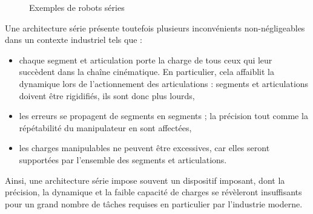 \begin{figure}[!ht]
  \centering
       \hfill
    \caption{\footnotesize{Exemples de robots séries}}
\label{intro:fig2}
\end{figure}

Une architecture série présente toutefois plusieurs inconvénients non-négligeables dans un contexte industriel tels que :
\begin{itemize}
 \item chaque segment et articulation porte la charge de tous ceux qui leur succèdent dans la chaîne cinématique. En particulier, cela affaiblit la dynamique lors de l'actionnement des articulations : segments et articulations doivent être rigidifiés, ils sont donc plus lourds, 
 \item les erreurs se propagent de segments en segments ; la précision tout comme la répétabilité du manipulateur en sont affectées,
 \item les charges manipulables ne peuvent être excessives, car elles seront supportées par l'ensemble des segments et articulations.
\end{itemize}

Ainsi, une architecture série impose souvent un dispositif imposant, dont la précision, la dynamique et la faible capacité de charges se révèleront insuffisants pour un grand nombre de tâches requises en particulier par l'industrie moderne.


